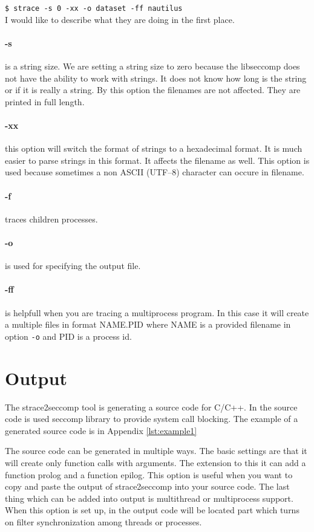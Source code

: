 \texttt{\$ strace -s 0 -xx -o dataset -ff nautilus }
\\
I would like to describe what they are doing in the first place.\cite{strace_man}

\paragraph{-s} is a string size. We are setting a string size to zero because
the libseccomp does not have the ability to work with strings. It does not know
how long is the string or if it is really a string. By this option the filenames
are not affected. They are printed in full length.

\paragraph{-xx} this option will switch the format of strings to a hexadecimal format.
It is much easier to parse strings in this format. It affects the filename as well.
This option is used because sometimes a non ASCII (UTF--8) character can occure in filename.

\paragraph{-f} traces children processes.

\paragraph{-o} is used for specifying the output file.

\paragraph{-ff} is helpfull when you are tracing a multiprocess program. In this
case it will create a multiple files in format NAME.PID where NAME is a provided
filename in option \texttt{-o} and PID is a process id.

\section{Output}
The strace2seccomp tool is generating a source code for C/C++.
In the source code is used seccomp library to provide system call blocking.
The example of a generated source code is in Appendix \ref{lst:example1}

The source code can be generated in multiple ways. The basic settings are that
it will create only function calls with arguments. The extension to this it can
add a function prolog and a function epilog. This option is useful when you want
to copy and paste the output of strace2seccomp into your source code. The last
thing which can be added into output is multithread or multiprocess support.
When this option is set up, in the output code will be located part which turns
on filter synchronization among threads or processes.

